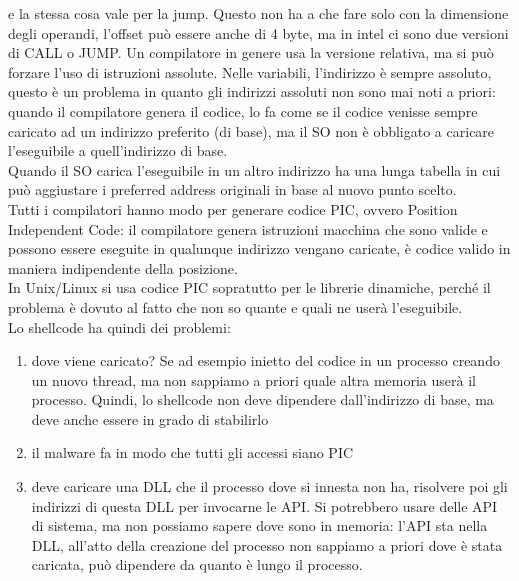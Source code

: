 \documentclass[12pt, oneside]{extbook}
\begin{document}
e la stessa cosa vale per la jump. Questo non ha a che fare solo con la dimensione degli operandi, l'offset può essere anche di 4 byte, ma in intel ci sono due versioni di CALL o JUMP. Un compilatore in genere usa la versione relativa, ma si può forzare l'uso di istruzioni assolute. Nelle variabili, l'indirizzo è sempre assoluto, questo è un problema in quanto gli indirizzi assoluti non sono mai noti a priori: quando il compilatore genera il codice, lo fa come se il codice venisse sempre caricato ad un indirizzo preferito (di base), ma il SO non è obbligato a caricare l'eseguibile a quell'indirizzo di base.\\Quando il SO carica l'eseguibile in un altro indirizzo ha una lunga tabella in cui può aggiustare i preferred address originali in base al nuovo punto scelto.\\Tutti i compilatori hanno modo per generare codice PIC, ovvero Position Independent Code: il compilatore genera istruzioni macchina che sono valide e possono essere eseguite in qualunque indirizzo vengano caricate, è codice valido in maniera indipendente della posizione.\\In Unix/Linux si usa codice PIC sopratutto per le librerie dinamiche, perché il problema è dovuto al fatto che non so quante e quali ne userà l'eseguibile.\\Lo shellcode ha quindi dei problemi:
\begin{enumerate}
	\item dove viene caricato? Se ad esempio inietto del codice in un processo creando un nuovo thread, ma non sappiamo a priori quale altra memoria userà il processo. Quindi, lo shellcode non deve dipendere dall'indirizzo di base, ma deve anche essere in grado di stabilirlo
	\item il malware fa in modo che tutti gli accessi siano PIC
	\item deve caricare una DLL che il processo dove si innesta non ha, risolvere poi gli indirizzi di questa DLL per invocarne le API. Si potrebbero usare delle API di sistema, ma non possiamo sapere dove sono in memoria: l'API sta nella DLL, all'atto della creazione del processo non sappiamo a priori dove è stata caricata, può dipendere da quanto è lungo il processo.
\end{enumerate}
\end{document}
